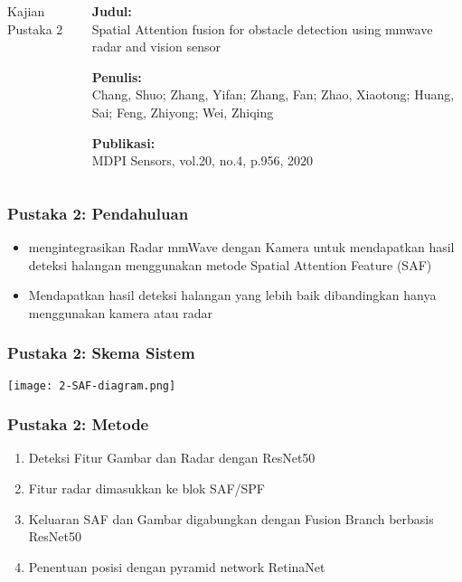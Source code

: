 
\begin{frame}
    \begin{columns}
        \begin{column}{0.35\textwidth}
            \LARGE
            Kajian Pustaka 2
        \end{column}
        \begin{column}{0.6\textwidth}
            \justifying
            \textbf{Judul:}\\
            Spatial Attention fusion for obstacle detection using mmwave radar and vision sensor

            \vspace{1.5em}

            \textbf{Penulis:}\\
            Chang, Shuo; Zhang, Yifan; Zhang, Fan; Zhao, Xiaotong; Huang, Sai; Feng, Zhiyong; Wei, Zhiqing

            \vspace{1.5em}
            
            \textbf{Publikasi:}\\
            MDPI Sensors, vol.20, no.4, p.956, 2020
        \end{column}
    \end{columns}
\end{frame}


\begin{frame}
    \frametitle{Pustaka 2: Pendahuluan}
    \large
    \begin{itemize}
        \justifying
        \item mengintegrasikan Radar mmWave dengan Kamera untuk mendapatkan hasil deteksi halangan menggunakan metode Spatial Attention Feature (SAF)
        \vspace{1em}
        \item Mendapatkan hasil deteksi halangan yang lebih baik dibandingkan hanya menggunakan kamera atau radar
    \end{itemize}
\end{frame}


\begin{frame}
    \frametitle{Pustaka 2: Skema Sistem}
    \centering
        \texttt{[image: 2-SAF-diagram.png]}
\end{frame}


\begin{frame}
    \frametitle{Pustaka 2: Metode}
    \begin{enumerate}
        \justifying
        \item Deteksi Fitur Gambar dan Radar dengan ResNet50
        \item Fitur radar dimasukkan ke blok SAF/SPF
        \item Keluaran SAF dan Gambar digabungkan dengan Fusion Branch berbasis ResNet50
        \item Penentuan posisi dengan pyramid network RetinaNet
    \end{enumerate}
\end{frame}


